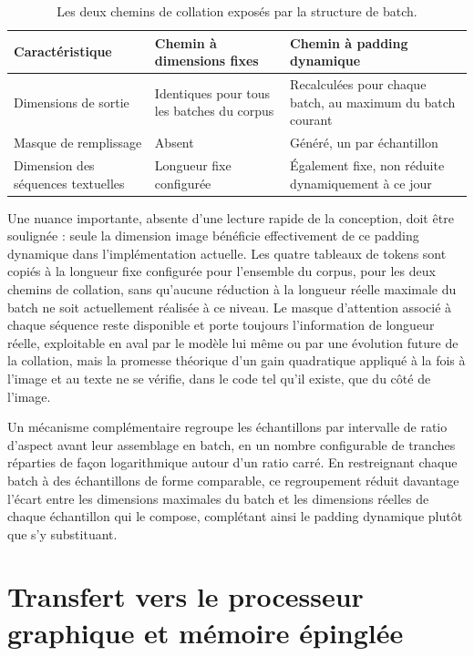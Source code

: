 \documentclass[12pt,a4paper]{report}
\begin{document}
\begin{table}[htbp]
\centering
\renewcommand{\arraystretch}{1.5}
\begin{tabular}{|p{4cm}|p{4.9cm}|p{4.9cm}|}
\hline
\textbf{Caractéristique} & \textbf{Chemin à dimensions fixes} & \textbf{Chemin à padding dynamique} \\
\hline
Dimensions de sortie & Identiques pour tous les batches du corpus & Recalculées pour chaque batch, au maximum du batch courant \\
\hline
Masque de remplissage & Absent & Généré, un par échantillon \\
\hline
Dimension des séquences textuelles & Longueur fixe configurée & Également fixe, non réduite dynamiquement à ce jour \\
\hline
\end{tabular}
\caption{Les deux chemins de collation exposés par la structure de batch.}
\label{tab:collation_paths}
\end{table}

Une nuance importante, absente d'une lecture rapide de la conception, doit être soulignée : seule la dimension image bénéficie effectivement de ce padding dynamique dans l'implémentation actuelle. Les quatre tableaux de tokens sont copiés à la longueur fixe configurée pour l'ensemble du corpus, pour les deux chemins de collation, sans qu'aucune réduction à la longueur réelle maximale du batch ne soit actuellement réalisée à ce niveau. Le masque d'attention associé à chaque séquence reste disponible et porte toujours l'information de longueur réelle, exploitable en aval par le modèle lui même ou par une évolution future de la collation, mais la promesse théorique d'un gain quadratique appliqué à la fois à l'image et au texte ne se vérifie, dans le code tel qu'il existe, que du côté de l'image.

Un mécanisme complémentaire regroupe les échantillons par intervalle de ratio d'aspect avant leur assemblage en batch, en un nombre configurable de tranches réparties de façon logarithmique autour d'un ratio carré. En restreignant chaque batch à des échantillons de forme comparable, ce regroupement réduit davantage l'écart entre les dimensions maximales du batch et les dimensions réelles de chaque échantillon qui le compose, complétant ainsi le padding dynamique plutôt que s'y substituant.

\section{Transfert vers le processeur graphique et mémoire épinglée}
\label{sec:gpu_transfer}
\end{document}
